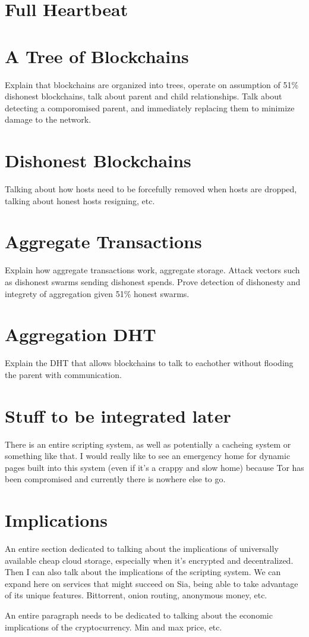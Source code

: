 \documentclass[twocolumn]{article}
\begin{document}
\section{Full Heartbeat}

\section{A Tree of Blockchains}

Explain that blockchains are organized into trees, operate on assumption of 51\% dishonest blockchains, talk about parent and child relationships. Talk about detecting a comporomised parent, and immediately replacing them to minimize damage to the network.

\section{Dishonest Blockchains}

Talking about how hosts need to be forcefully removed when hosts are dropped, talking about honest hosts resigning, etc.

\section{Aggregate Transactions}

Explain how aggregate transactions work, aggregate storage. Attack vectors such as dishonest swarms sending dishonest spends. Prove detection of dishonesty and integrety of aggregation given 51\% honest swarms.

\section{Aggregation DHT}

Explain the DHT that allows blockchains to talk to eachother without flooding the parent with communication.

\section{Stuff to be integrated later}

There is an entire scripting system, as well as potentially a cacheing system or something like that. I would really like to see an emergency home for dynamic pages built into this system (even if it's a crappy and slow home) because Tor has been compromised and currently there is nowhere else to go.

\section{Implications}

An entire section dedicated to talking about the implications of universally available cheap cloud storage, especially when it's encrypted and decentralized.
Then I can also talk about the implications of the scripting system.
We can expand here on services that might succeed on Sia, being able to take advantage of its unique features.
Bittorrent, onion routing, anonymous money, etc.

An entire paragraph needs to be dedicated to talking about the economic implications of the cryptocurrency.
Min and max price, etc.
\end{document}
